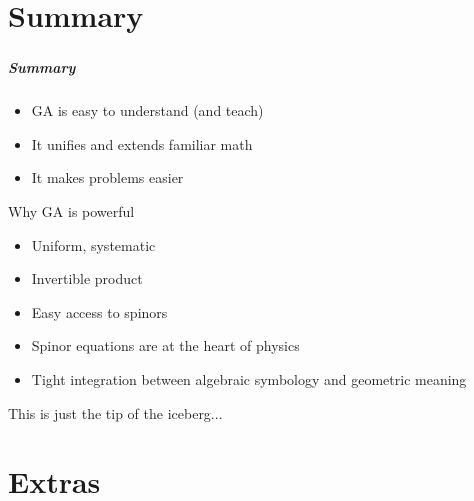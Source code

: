\documentclass[12pt,xcolor={dvipsnames}]{beamer}
\begin{document}


\part{Summary}

\section{}

\begin{frame}
  \frametitle{Summary}
  \begin{itemize}
   \item GA is easy to understand (and teach)
   \item It unifies and extends familiar math
   \item It makes problems easier
  \end{itemize}

  \vspace{0.4in}

  Why GA is powerful
  \begin{itemize}
   \item Uniform, systematic
   \item Invertible product
   \item Easy access to spinors
   \item Spinor equations are at the heart of physics
   \item Tight integration between algebraic symbology and geometric
    meaning
  \end{itemize}
  This is just the tip of the iceberg...
\end{frame}




\part{} \begin{frame} \end{frame}

\part{Extras}
\end{document}
